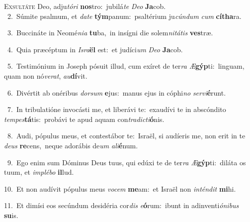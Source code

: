 \lettrine{\initial\textcolor{\initialcolor}{E}}{xsultáte} Deo, adju\-\textit{tó}\-\textit{ri} \textbf{nos}\-tro:~\star jubilá\textit{te} \textit{De}\-\textit{o} \textbf{Ja}\-cob.\\
{\numbfont\textcolor{\numbcolor}{~2.}}~Súmite psalmum, et \textit{da}\-\textit{te} \textbf{tým}\-panum:~\star psaltérium ju\-\textit{cún}\-\textit{dum} \textit{cum} \textbf{cí}\-\textbf{tha}ra.\par
{\numbfont\textcolor{\numbcolor}{~3.}}~Buccináte in Neomé\-\textit{ni}\-\textit{a} \textbf{tu}\-ba,~\star in insígni die solem\-\textit{ni}\-\textit{tá}\textit{tis} \textbf{ves}\-træ.\par
{\numbfont\textcolor{\numbcolor}{~4.}}~Quia præcéptum in \textit{Is}\-\textit{ra}\textbf{ël} est:~\star et judíci\textit{um} \textit{De}\-\textit{o} \textbf{Ja}\-cob.\par
{\numbfont\textcolor{\numbcolor}{~5.}}~Testimónium in Joseph pósuit illud, cum exíret de ter\textit{ra} \textit{Æ}\-\textbf{gýp}ti:~\star linguam, quam non nó\-\textit{ve}\-\textit{rat}, \textit{au}\-\textbf{dí}vit.\par
{\numbfont\textcolor{\numbcolor}{~6.}}~Divértit ab onéribus \textit{dor}\-\textit{sum} \textbf{e}\-jus:~\star manus ejus in cóphi\textit{no} \textit{ser}\-\textit{vi}\textbf{é}runt.\par
{\numbfont\textcolor{\numbcolor}{~7.}}~In tribulatióne invocásti me, et liberávi te:~\dagger exaudívi te in abscóndito \textit{tem}\-\textit{pes}\textbf{tá}tis:~\star probávi te apud aquam con\-\textit{tra}\-\textit{dic}\textit{ti}\textbf{ó}nis.\par
{\numbfont\textcolor{\numbcolor}{~8.}}~Audi, pópulus meus, et contestábor te:~\dagger Israël, si audíeris me, non erit in te \textit{de}\-\textit{us} \textbf{re}\-cens,~\star neque adorábis de\textit{um} \textit{a}\-\textit{li}\textbf{é}num.\par
{\numbfont\textcolor{\numbcolor}{~9.}}~Ego enim sum Dóminus Deus tuus, qui edúxi te de ter\textit{ra} \textit{Æ}\-\textbf{gýp}ti:~\star diláta os tuum, et \textit{im}\-\textit{plé}\textit{bo} \textbf{il}\-lud.\par
{\numbfont\textcolor{\numbcolor}{10.}}~Et non audívit pópulus meus \textit{vo}\-\textit{cem} \textbf{me}\-am:~\star et Israël non \textit{in}\-\textit{tén}\textit{dit} \textbf{mi}\-hi.\par
{\numbfont\textcolor{\numbcolor}{11.}}~Et dimísi eos secúndum desidéria cor\textit{dis} \textit{e}\-\textbf{ó}rum:~\star ibunt in adinventi\-\textit{ó}\-\textit{ni}\textit{bus} \textbf{su}\-is.\par
